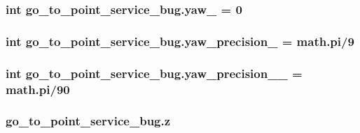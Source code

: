\subsubsection[{\texorpdfstring{yaw\+\_\+}{yaw_}}]{\setlength{\rightskip}{0pt plus 5cm}int go\+\_\+to\+\_\+point\+\_\+service\+\_\+bug.\+yaw\+\_\+ = 0}\hypertarget{namespacego__to__point__service__bug_a92ae1b18b13762d59aa27dd83ea9e04d}{}\label{namespacego__to__point__service__bug_a92ae1b18b13762d59aa27dd83ea9e04d}
\subsubsection[{\texorpdfstring{yaw\+\_\+precision\+\_\+}{yaw_precision_}}]{\setlength{\rightskip}{0pt plus 5cm}int go\+\_\+to\+\_\+point\+\_\+service\+\_\+bug.\+yaw\+\_\+precision\+\_\+ = math.\+pi/9}\hypertarget{namespacego__to__point__service__bug_aa27745ad563c25adbac628695bbdd44d}{}\label{namespacego__to__point__service__bug_aa27745ad563c25adbac628695bbdd44d}
\subsubsection[{\texorpdfstring{yaw\+\_\+precision\+\_\+2\+\_\+}{yaw_precision_2_}}]{\setlength{\rightskip}{0pt plus 5cm}int go\+\_\+to\+\_\+point\+\_\+service\+\_\+bug.\+yaw\+\_\+precision\+\_\+\_\+ = math.\+pi/90}\hypertarget{namespacego__to__point__service__bug_a2cfb8eb9d839627bee23494c162a1e88}{}\label{namespacego__to__point__service__bug_a2cfb8eb9d839627bee23494c162a1e88}
\subsubsection[{\texorpdfstring{z}{z}}]{\setlength{\rightskip}{0pt plus 5cm}go\+\_\+to\+\_\+point\+\_\+service\+\_\+bug.\+z}\hypertarget{namespacego__to__point__service__bug_ac72a9ad64f48ea907c94e25a3718372c}{}\label{namespacego__to__point__service__bug_ac72a9ad64f48ea907c94e25a3718372c}
